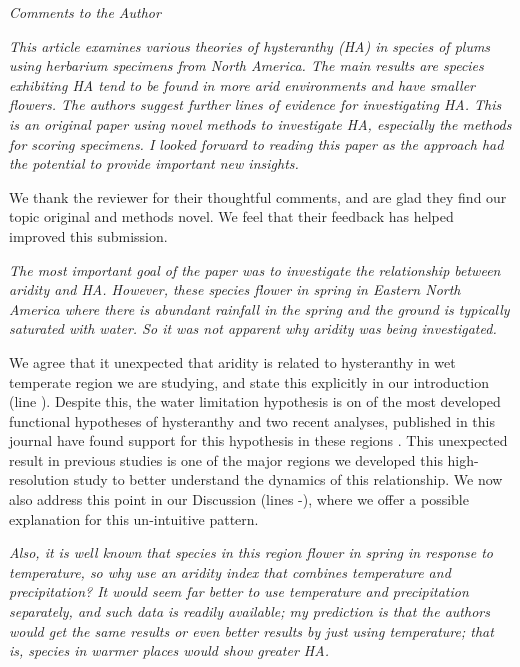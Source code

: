\documentclass{article}[12pt]
\begin{document}


\emph{Comments to the Author}

\emph{This article examines various theories of hysteranthy (HA) in species of plums using herbarium specimens from North America. The main results are species exhibiting HA tend to be found in more arid environments and have smaller flowers.  The authors suggest further lines of evidence for investigating HA. This is an original paper using novel methods to investigate HA, especially the methods for scoring specimens.  I looked forward to reading this paper as the approach had the potential to provide important new insights.}

We thank the reviewer for their thoughtful comments, and are glad they find our topic original and methods novel. We feel that their feedback has helped improved this submission.

\emph{The most important goal of the paper was to investigate the relationship between aridity and HA. However, these species flower in spring in Eastern North America where there is abundant rainfall in the spring and the ground is typically saturated with water. So it was not apparent why aridity was being investigated.}

We agree that it unexpected that aridity is related to hysteranthy in wet temperate region we are studying, and state this explicitly in our introduction (line ). Despite this, the water limitation hypothesis is on of the most developed functional hypotheses of hysteranthy and two recent analyses, published in this journal have found support for this hypothesis in these regions \citep{Gougherty2018,Buonaiuto2020}. This unexpected result in previous studies is one of the major regions we developed this high-resolution study to better understand the dynamics of this relationship. We now also address this point in our Discussion (lines -), where we offer a possible explanation for this un-intuitive pattern.

\emph{Also, it is well known that species in this region flower in spring in response to temperature, so why use an aridity index that combines temperature and precipitation?  It would seem far better to use temperature and precipitation separately, and such data is readily available; my prediction is that the authors would get the same results or even better results by just using temperature; that is, species in warmer places would show greater HA.}
\end{document}
